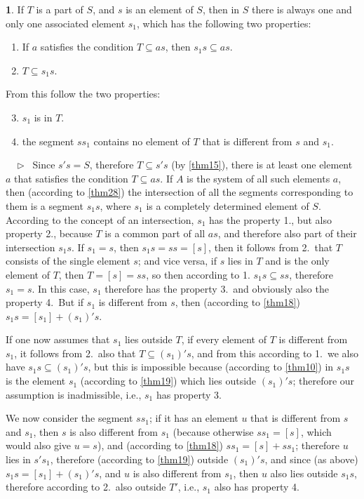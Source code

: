 \documentclass[leqno,hidelinks,10pt]{article}
\theoremstyle{definition}
\newtheorem{satz}{\protect\satzname}
\newcommand{\satzname}{}
\renewcommand{\satzname}{\hspace{-4pt}.\ Satz}%
\renewcommand{\satzname}{\hspace{-4pt}.\ Theorem}%
\newcommand\beweis{ $ \phantom{'.'} \rhd \ $}%
\newcommand{\partof}{\subseteq}
\newcommand{\sref}[1]{\underline{\ref{#1}}}%
\begin{document}
\begin{paracol}{2}
\begin{rightcolumn}
\begin{satz}\label{thm29}
If $T$ is a part of $S$, and $s$ is an element of $S$, then in $S$ there is always
one and only one associated element $s_1$, which has the following two properties:
\begin{enumerate} \setcounter{enumi}{0} \setlength\itemsep{-0.25em}
  \item If $a$ satisfies the condition $T \partof as$, then $s_1s \partof as$.
  \item $T \partof s_1s$.
\end{enumerate}
From this follow the two properties:
\begin{enumerate} \setcounter{enumi}{2} \setlength\itemsep{-0.25em}
  \item $s_1$ is in $T$.
  \item the segment $ss_1$ contains no element of $T$ that is different from $s$ and $s_1$.
\end{enumerate}
\beweis
Since $s's = S$, therefore $T \partof s's$ (by \sref{thm15}), there is at least
one element $a$ that satisfies the condition $T \partof as$. If $A$ is the system
of all such elements $a$, then (according to \sref{thm28}) the intersection of
all the segments corresponding to them is a segment $s_1s$, where $s_1$ is a
completely determined element of $S$. According to the concept of an intersection,
$s_1$ has the property 1., but also property 2., because $T$ is a common part of
all $as$, and therefore also part of their intersection $s_1s$. If $s_1 = s$,
then $s_1s = ss = [s]$, then it follows from 2.\ that $T$ consists of the single
element $s$; and vice versa, if $s$ lies in $T$ and is the only element of $T$,
then $T = [s] = ss$, so then according to 1. $s_1s \partof ss$, therefore $s_1 = s$.
In this case, $s_1$ therefore has the property 3.\ and obviously also the property
4.\ But if $s_1$ is different from $s$, then (according to \sref{thm18})
$s_1s = [s_1] + (s_1)'s$.

If one now assumes that $s_1$ lies outside $T$, if every element of $T$ is
different from $s_1$, it follows from 2.\ also that $T \partof (s_1)'s$, and from
this according to 1.\ we also have $s_1s \partof (s_1)'s$, but this is impossible
because (according to \sref{thm10}) in $s_1s$ is the element $s_1$ (according to
\sref{thm19}) which lies outside $(s_1)'s$; therefore our assumption is inadmissible,
i.e., $s_1$ has property 3.

We now consider the segment $ss_1$; if it has an element $u$ that is different
from $s$ and $s_1$, then $s$ is also different from $s_1$ (because otherwise
$ss_1 = [s]$, which would also give $u=s$), and (according to \sref{thm18})
$ss_1 = [s] + ss_1$; therefore $u$ lies in $s's_1$, therefore (according to
\sref{thm19}) outside $(s_1)'s$, and since (as above) $s_1s= [s_1] + (s_1)'s$,
and $u$ is also different from $s_1$, then $u$ also lies outside $s_1s$, therefore
according to 2.\ also outside $T'$, i.e., $s_1$ also has property 4.
\end{satz}


\end{rightcolumn}
\end{paracol}
\end{document}
